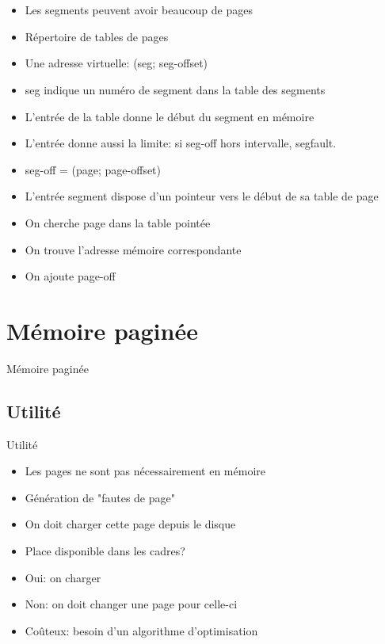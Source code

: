 \section{\sectitle}
\begin{frame}{\sectitle}
\begin{block}{\subsectitle}
\begin{itemize}
    \item Les segments peuvent avoir beaucoup de pages
    \item Répertoire de tables de pages
    \item Une adresse virtuelle: (seg; seg-offset)
    \item seg indique un numéro de segment dans la table des segments
    \item L'entrée de la table donne le début du segment en mémoire
    \item L'entrée donne aussi la limite: si seg-off hors intervalle, segfault.
    \item seg-off = (page; page-offset)
    \item L'entrée segment dispose d'un pointeur vers le début de sa table de
    page
    \item On cherche page dans la table pointée
    \item On trouve l'adresse mémoire correspondante
    \item On ajoute page-off
\end{itemize}
\end{block}
\end{frame}

\def\sectitle{Mémoire paginée}
\section{\sectitle}
\begin{frame}{\sectitle}
\def\subsectitle{Utilité}
\subsection{\subsectitle}
\begin{block}{\subsectitle}
\begin{itemize}
    \item Les pages ne sont pas nécessairement en mémoire
    \item Génération de "fautes de page"
    \item On doit charger cette page depuis le disque
    \item Place disponible dans les cadres?
    \item Oui: on charger
    \item Non: on doit changer une page pour celle-ci
    \item Coûteux: besoin d'un algorithme d'optimisation
\end{itemize}
\end{block}
\end{frame}

